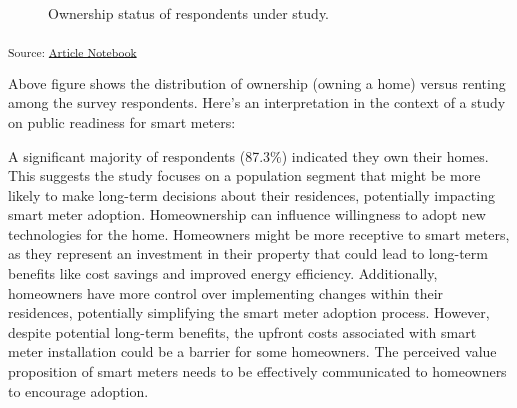 \documentclass[
  letterpaper,
  DIV=11,
  numbers=noendperiod]{scrartcl}
\begin{document}
\begin{figure}[H]


\caption{\label{fig-piechartos}Ownership status of respondents under
study.}

\end{figure}%

\textsubscript{Source:
\href{https://sijuswamyresearch.github.io/SM-project/index-preview.html}{Article
Notebook}}

Above figure shows the distribution of ownership (owning a home) versus
renting among the survey respondents. Here's an interpretation in the
context of a study on public readiness for smart meters:

A significant majority of respondents (87.3\%) indicated they own their
homes. This suggests the study focuses on a population segment that
might be more likely to make long-term decisions about their residences,
potentially impacting smart meter adoption. Homeownership can influence
willingness to adopt new technologies for the home. Homeowners might be
more receptive to smart meters, as they represent an investment in their
property that could lead to long-term benefits like cost savings and
improved energy efficiency. Additionally, homeowners have more control
over implementing changes within their residences, potentially
simplifying the smart meter adoption process. However, despite potential
long-term benefits, the upfront costs associated with smart meter
installation could be a barrier for some homeowners. The perceived value
proposition of smart meters needs to be effectively communicated to
homeowners to encourage adoption.
\end{document}
